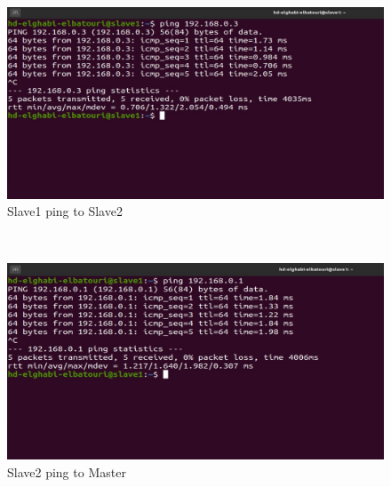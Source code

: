 \begin{spacing}{1.2}
\\
\begin{figure}[!htb] 
\begin{center} 
\includegraphics[width=1\linewidth]{Big_Data/Hadoop/Multi-Nodes Cluster/Slave1 ping to Slave2} 
\end{center} 
\caption{Slave1 ping to Slave2} 
\end{figure} 
\FloatBarrier
\\
\begin{figure}[!htb] 
\begin{center} 
\includegraphics[width=1\linewidth]{Big_Data/Hadoop/Multi-Nodes Cluster/Slave2 ping to Master} 
\end{center} 
\caption{Slave2 ping to Master} 
\end{figure} 
\FloatBarrier


\end{spacing}
